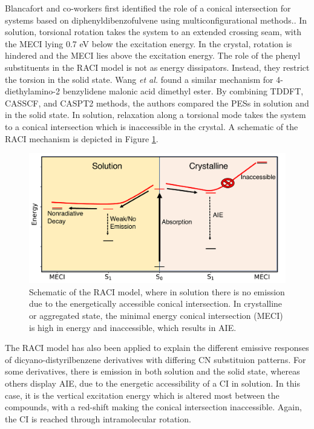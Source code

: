 Blancafort and co-workers first identified the role of a conical intersection for systems based on diphenyldibenzofulvene using multiconfigurational methods.\cite{Li2013}. In solution, torsional rotation takes the system to an extended crossing seam, with the \ac{MECI} lying 0.7 eV below the excitation energy. In the crystal, rotation is hindered and the \ac{MECI} lies above the excitation energy. The role of the phenyl substituents in the RACI model is not as energy dissipators. Instead, they restrict the torsion in the solid state.   Wang \textit{et al.} found a similar mechanism for 4-diethylamino-2 benzylidene malonic acid dimethyl ester. \cite{Wang2016} By combining TDDFT, CASSCF, and CASPT2 methods, the authors compared the \acp{PES} in solution and in the solid state. In solution, relaxation along a torsional mode takes the system to a conical intersection which is inaccessible in the crystal. A schematic of the \ac{RACI} mechanism is depicted in Figure \ref{figure: RACI}.

\begin{figure}[t]
\centering
  \includegraphics[width=0.9\linewidth]{1Intro/RACI_Model.pdf}
  \caption[Schematic of the RACI Model]{Schematic of the RACI model, where in solution there is no emission due to the energetically accessible conical intersection. In crystalline or aggregated state, the minimal energy conical intersection (MECI) is high in energy and inaccessible, which results in AIE.}
  \label{figure: RACI}
\end{figure}

The RACI model has also been applied to explain the different emissive responses of dicyano-distyrilbenzene derivatives with differing CN substituion patterns.\cite{Shi2017} For some derivatives, there is emission in both solution and the solid state, whereas others display AIE, due to the energetic accessibility of a CI in solution. In this case, it is the vertical excitation energy which is altered most between the compounds, with a red-shift making the conical intersection inaccessible. Again, the CI is reached through intramolecular rotation.


